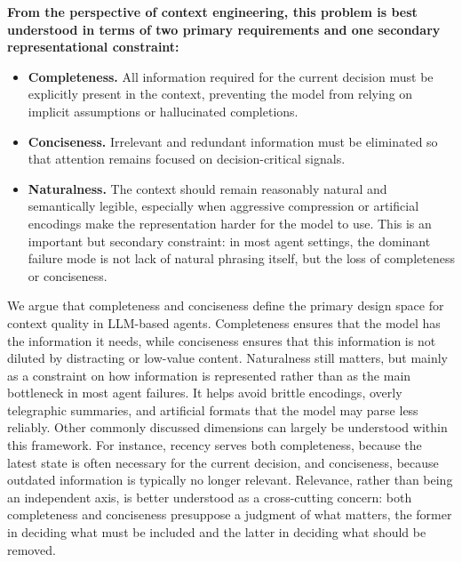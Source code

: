 \textbf{From the perspective of context engineering, this problem is best understood in terms of two primary requirements and one secondary representational constraint:}
\begin{itemize}
    \item \textbf{Completeness.} {\small
    All information required for the current decision must be explicitly present in the context, preventing the model from relying on implicit assumptions or hallucinated completions.
    }

    \item \textbf{Conciseness.} {\small
    Irrelevant and redundant information must be eliminated so that attention remains focused on decision-critical signals.
    }

    \item \textbf{Naturalness.} {\small
    The context should remain reasonably natural and semantically legible, especially when aggressive compression or artificial encodings make the representation harder for the model to use. This is an important but secondary constraint: in most agent settings, the dominant failure mode is not lack of natural phrasing itself, but the loss of completeness or conciseness.
    }
\end{itemize}

We argue that completeness and conciseness define the primary design space for context quality in LLM-based agents. Completeness ensures that the model has the information it needs, while conciseness ensures that this information is not diluted by distracting or low-value content. Naturalness still matters, but mainly as a constraint on how information is represented rather than as the main bottleneck in most agent failures. It helps avoid brittle encodings, overly telegraphic summaries, and artificial formats that the model may parse less reliably. Other commonly discussed dimensions can largely be understood within this framework. For instance, recency serves both completeness, because the latest state is often necessary for the current decision, and conciseness, because outdated information is typically no longer relevant. Relevance, rather than being an independent axis, is better understood as a cross-cutting concern: both completeness and conciseness presuppose a judgment of what matters, the former in deciding what must be included and the latter in deciding what should be removed.

